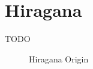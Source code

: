 
\section{Hiragana}\label{sec:Hiragana}


TODO

\begin{figure}[H]
\begin{center}

\caption{Hiragana Origin}
\label{fig:HiraganaOrigin} %
\end{center}
\end{figure}
